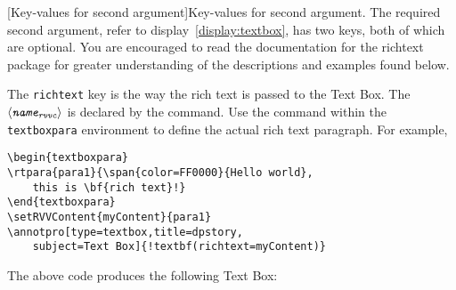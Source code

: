 \documentclass[12pt]{article}
\makeatletter
\def\pkg{\textsf}
\let\opt\texttt
\let\uif\textsf
\let\env\texttt
\def\ameta#1{$\langle\textit{\texttt{#1}}\rangle$}
\def\SUB#1{\ensuremath{{}_{\text{#1}}}}
\renewenvironment{quote}[1][]
   {\def\@rgi{#1}\ifx\@rgi\@empty
    \let\rghtm\@empty\else\def\rghtm{\rightmargin\leftmargin}\fi
    \list{}{\rghtm} %
    \item\relax}
   {\endlist}
\renewcommand*{\theparagraph}{\texorpdfstring{\protect\P\protect\ }{\textparagraph}}
\renewcommand{\paragraph}
    {\renewcommand{\@seccntformat}[1]{\theparagraph}%
    \@startsection{paragraph}{4}{0pt}{6pt}{-3pt}{\color{\aeb@subsubsectioncolor}\bfseries}}
\makeatother
\begin{document}
\paragraph[Key-values for second argument]{Key-values for second argument.}\label{para:KV2ndArg}
The required second argument, refer to display~\eqref{display:textbox}, has
two keys, both of which are optional. You are encouraged to read the
documentation for the \pkg{richtext} package for greater understanding of the
descriptions and examples found below.
\begin{description}
    \item[\texttt{richtext=\ameta{name\SUB{rvvc}}}] The \opt{richtext} key
        is the way the rich text is passed to the \uif{Text Box}. The
        \ameta{name\SUB{rvvc}} is declared by the 
        command. Use the command  within the \env{textboxpara}
        environment to define the actual rich text paragraph. For example,
\begin{Verbatim}[fontsize=\small,commandchars=!()]
\begin{textboxpara}
\rtpara{para1}{\span{color=FF0000}{Hello world},
    this is \bf{rich text}!}
\end{textboxpara}
\setRVVContent{myContent}{para1}
\annotpro[type=textbox,title=dpstory,
    subject=Text Box]{!textbf(richtext=myContent)}
\end{Verbatim}
The above code produces the following \uif{Text Box}:
\begin{quote}
\begin{textboxpara}
\end{textboxpara}
\end{quote}


\end{description}
\end{document}
